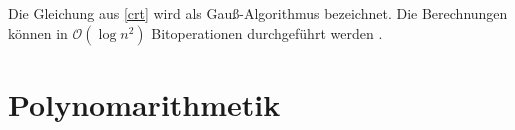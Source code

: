 Die Gleichung aus \ref{crt} wird als Gauß-Algorithmus bezeichnet.
Die Berechnungen können in $\mathcal{O}(\log{}n^2)$ Bitoperationen
durchgeführt werden \cite{menezes:1997}. 
 



\section{Polynomarithmetik}